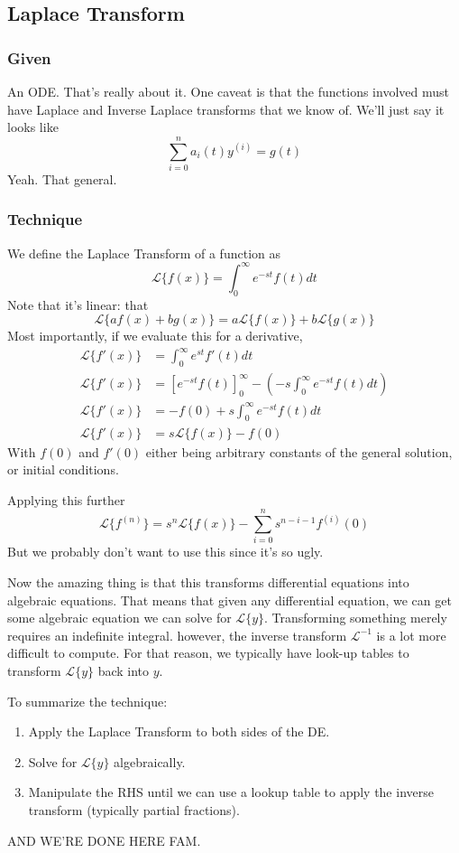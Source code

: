 \documentclass[11pt]{article}
\begin{document}
\subsection{Laplace Transform}
\subsubsection{Given}
An ODE. That's really about it. One caveat is that the functions involved must have Laplace and 
Inverse Laplace transforms that we know of. We'll just say it looks like
    \[ \sum_{i=0}^n a_i(t)y^{(i)}= g(t) \]
Yeah. That general.
\subsubsection{Technique}
We define the Laplace Transform of a function as
\[ \mathscr{L}\{f(x)\} = \int_{0}^{\infty} e^{-st}f(t)dt \]
Note that it's linear: that
\[ \mathscr{L}\{af(x) + bg(x)\} = a\mathscr{L}\{f(x)\} + b\mathscr{L}\{g(x)\} \]
Most importantly, if we evaluate this for a derivative,
\begin{align*}
    \mathscr{L}\{f'(x)\} &= \int_{0}^{\infty} e^{st}f'(t)dt  \\
    \mathscr{L}\{f'(x)\} &=  \left[ e^{-st}f(t)\right]_0^{\infty} -\left(- s\int_0^{\infty} e^{-st}f(t)dt \right)  \\
    \mathscr{L}\{f'(x)\} &=   -f(0) + s\int_0^{\infty} e^{-st}f(t)dt  \\
    \mathscr{L}\{f'(x)\} &=   s\mathscr{L}\{f(x)\} - f(0)
\end{align*}
With $f(0)$ and $f'(0)$ either being arbitrary constants of the general solution, or initial conditions.

Applying this further
\[ \mathscr{L}\{f^{(n)}\} = s^n\mathscr{L}\{f(x)\} - \sum_{i=0}^{n} s^{n-i-1}f^{(i)}(0) \]
But we probably don't want to use this since it's so ugly.

Now the amazing thing is that this transforms differential equations into algebraic equations. That means that
given any differential equation, we can get some algebraic equation we can solve for $\mathscr{L}\{y\}$. 
Transforming something merely requires an indefinite integral. however, the inverse transform $\mathscr{L}^{-1}$
is a lot more difficult to compute. For that reason, we typically have look-up tables to transform 
$\mathscr{L}\{y\}$ back into $y$.

To summarize the technique:
\begin{enumerate}
    \item Apply the Laplace Transform to both sides of the DE.
    \item Solve for $\mathscr{L}\{y\}$ algebraically.
    \item Manipulate the RHS until we can use a lookup table to apply the inverse transform (typically partial
          fractions).
\end{enumerate}
AND WE'RE DONE HERE FAM.
\end{document}
